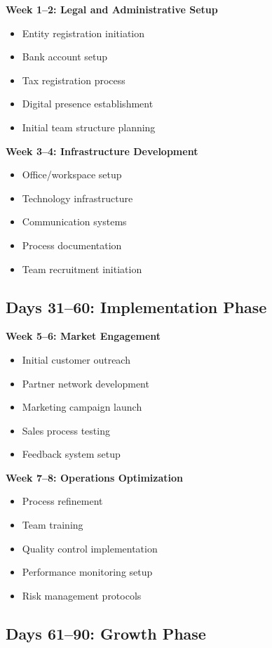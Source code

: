 \textbf{Week 1--2: Legal and Administrative Setup}
\begin{itemize}
    \item Entity registration initiation
    \item Bank account setup
    \item Tax registration process
    \item Digital presence establishment
    \item Initial team structure planning
\end{itemize}

\textbf{Week 3--4: Infrastructure Development}
\begin{itemize}
    \item Office/workspace setup
    \item Technology infrastructure
    \item Communication systems
    \item Process documentation
    \item Team recruitment initiation
\end{itemize}

\subsection{Days 31--60: Implementation Phase}\label{subsec:implementation-phase}

\textbf{Week 5--6: Market Engagement}
\begin{itemize}
    \item Initial customer outreach
    \item Partner network development
    \item Marketing campaign launch
    \item Sales process testing
    \item Feedback system setup
\end{itemize}

\textbf{Week 7--8: Operations Optimization}
\begin{itemize}
    \item Process refinement
    \item Team training
    \item Quality control implementation
    \item Performance monitoring setup
    \item Risk management protocols
\end{itemize}

\subsection{Days 61--90: Growth Phase}\label{subsec:growth-phase}

